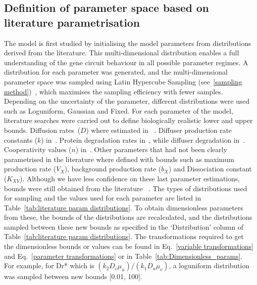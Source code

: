 \subsection{Definition of parameter space based on literature parametrisation}\label{Definition of parameter space based on literature parametrisation}
The model is first studied by initialising the model parameters from distributions derived from the literature.
This multi-dimensional distribution enables a full understanding of the gene circuit behaviour in all possible parameter regimes.
A distribution for each parameter was generated, and the multi-dimensional parameter space was sampled using Latin Hypercube Sampling (see~\ref{sampling method})~\parencite{Iman2014, Bergstra2012}, which maximises the sampling efficiency with fewer samples.
Depending on the uncertainty of the parameter, different distributions were used such as Loguniform, Gaussian and Fixed.
 For each parameter of the model, literature searches were carried out to define biologically realistic lower and upper bounds.
Diffusion rates~($D$) where estimated in ~\cite{tica_diffusers}.
Diffuser production rate constants ($k$) in~\cite{Schaefer1996, Pai2009}.
Protein degradation rates in~\cite{Andersen1998}, while diffuser degradation in~\cite{kaufmann2005revisiting}.
Cooperativity values ($n$) in~\cite{Babic2007}.
Other parameters that had not been clearly parametrised in the literature where defined with bounds such as maximum production rate ($V_{X}$), background production rate ($b_{X}$) and Dissociation constant ($K_{XY}$). Although we have less confidence on these last parameter estimations, bounds were still obtained from the literature ~\parencite{Scholes2019, Pusnik2019}.
The types of distributions used for sampling and the values used for each parameter are listed in Table~\ref{tab:literature param distributions}.
To obtain dimensionless parameters from these, the bounds of the distributions are recalculated, and the distributions sampled between these new bounds as specified in the ‘Distribution’ column of Table~\ref{tab:literature param distributions}.
The transformations required to get the dimensionless bounds or values can be found in Eq.~\ref{variable transformations} and Eq.~\ref{parameter transformations} or in Table~\ref{tab:Dimensionless_params}.
For example, for Dr* which is $(k_{2}D_{v}\mu_{u})/(k_{1}D_{u}\mu_{v})$, a loguniform distribution was sampled between new bounds [0.01, 100].
